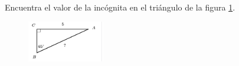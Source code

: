 \question[15]  Encuentra el valor de la incógnita en el triángulo de la figura \ref{fig:lados_functrig_07}.
\begin{figure}[H]
    \begin{center}
        \includegraphics[width=0.3\textwidth]{../images/lados_functrig_07.png}
    \end{center}
    \caption{}
    \label{fig:lados_functrig_07}
\end{figure}